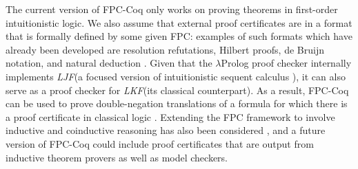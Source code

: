 \documentclass[submission,copyright,creativecommons]{eptcs}
\newcommand{\lP}{$\lambda$Prolog\xspace}
\newcommand{\LKF}{\hbox{\sl LKF}\xspace}
\newcommand{\LJF}{\hbox{\sl LJF}\xspace}
\newcommand{\fpccoq}{FPC-Coq\xspace}
\begin{document}
The current version of \fpccoq only works on proving theorems in
first-order intuitionistic logic.  We also assume that external proof
certificates are in a format that is formally defined by some given
FPC: examples of such formats which have already been developed are
resolution refutations, Hilbert proofs, de Bruijn notation, and
natural deduction \cite{chihani17jar}.  Given that the \lP proof
checker internally implements \LJF (a focused version of
intuitionistic sequent calculus \cite{liang09tcs}), it can also serve
as a proof checker for \LKF (its classical counterpart).  As a result,
\fpccoq can be used to prove double-negation translations of a formula
for which there is a proof certificate in classical logic
\cite{chihani17jar}.  Extending the FPC framework to involve inductive
and coinductive reasoning has also been considered
\cite{heath15pxtp,heath19jar}, and a future version of \fpccoq could
include proof certificates that are output from inductive theorem
provers as well as model checkers.
\end{document}
